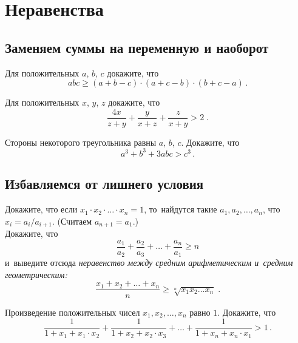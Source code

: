 
\section*{Неравенства}



\subsection*{Заменяем суммы на переменную и наоборот}

\begin{problems}

\item
Для положительных $a$, $b$, $c$ докажите, что
\[
    a b c
\geq
    (a + b - c) \cdot (a + c - b) \cdot (b + c - a)
\, . \]

\item
Для положительных $x$, $y$, $z$ докажите, что
\[
    \frac{4 x}{z + y} + \frac{y}{x + z} + \frac{z}{x + y}
>
    2
\; . \]

\item
Стороны некоторого треугольника равны $a$, $b$, $c$.
Докажите, что
\[
    a^3 + b^3 + 3 a b c > c^3
\, . \]

\end{problems}


\subsection*{Избавляемся от лишнего условия}

\begin{problems}

\item
\subproblem
Докажите, что если
\(
    x_1 \cdot x_2 \cdot \ldots \cdot x_n = 1
\), то~найдутся такие $a_1, a_2, \ldots, a_n$, что $x_i = a_i / a_{i+1}$.
(Считаем $a_{n+1} = a_1$.)
\\
\sp
Докажите, что
\[
    \frac{a_1}{a_2} + \frac{a_2}{a_3} + \ldots + \frac{a_n}{a_1}
\geq
    n
\]
и~выведите отсюда \emph{неравенство между средним арифметическим и~средним
геометрическим:}
\[
    \frac{x_1 + x_2 + \ldots + x_n}{n}
\geq
    \sqrt[n]{x_1 x_2 \ldots x_n}
\;\text{.} \]

\item
Произведение положительных чисел $x_1, x_2, \ldots, x_n$ равно $1$.
Докажите, что
\[
    \frac{1}{1 + x_1 + x_1 \cdot x_2} +
    \frac{1}{1 + x_2 + x_2 \cdot x_3} +
    \ldots +
    \frac{1}{1 + x_n + x_n \cdot x_1}
>
    1
\, . \]

\end{problems}


